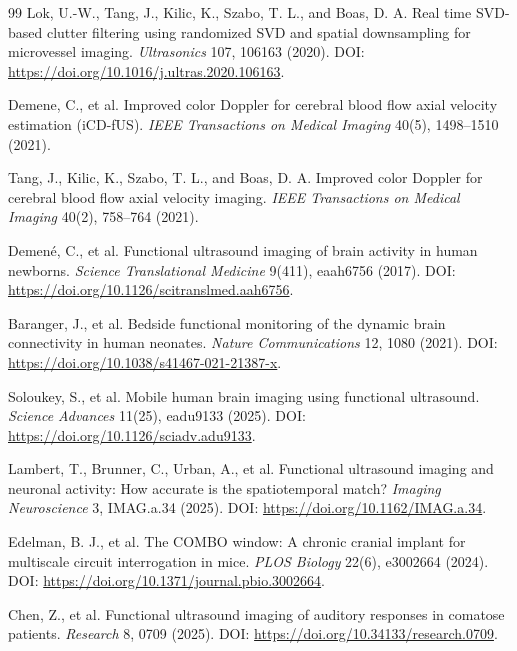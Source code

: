 \documentclass[11pt]{article}
\begin{document}
\begin{thebibliography}{99}
Lok, U.-W., Tang, J., Kilic, K., Szabo, T. L., and Boas, D. A.
\newblock Real time SVD-based clutter filtering using randomized SVD and spatial downsampling for microvessel imaging.
\newblock \emph{Ultrasonics} 107, 106163 (2020).
\newblock DOI: \url{https://doi.org/10.1016/j.ultras.2020.106163}.

Demene, C., et al.
\newblock Improved color Doppler for cerebral blood flow axial velocity estimation (iCD-fUS).
\newblock \emph{IEEE Transactions on Medical Imaging} 40(5), 1498--1510 (2021).

Tang, J., Kilic, K., Szabo, T. L., and Boas, D. A.
\newblock Improved color Doppler for cerebral blood flow axial velocity imaging.
\newblock \emph{IEEE Transactions on Medical Imaging} 40(2), 758--764 (2021).

Demen{\'e}, C., et al.
\newblock Functional ultrasound imaging of brain activity in human newborns.
\newblock \emph{Science Translational Medicine} 9(411), eaah6756 (2017).
\newblock DOI: \url{https://doi.org/10.1126/scitranslmed.aah6756}.

Baranger, J., et al.
\newblock Bedside functional monitoring of the dynamic brain connectivity in human neonates.
\newblock \emph{Nature Communications} 12, 1080 (2021).
\newblock DOI: \url{https://doi.org/10.1038/s41467-021-21387-x}.

Soloukey, S., et al.
\newblock Mobile human brain imaging using functional ultrasound.
\newblock \emph{Science Advances} 11(25), eadu9133 (2025).
\newblock DOI: \url{https://doi.org/10.1126/sciadv.adu9133}.

Lambert, T., Brunner, C., Urban, A., et al.
\newblock Functional ultrasound imaging and neuronal activity: How accurate is the spatiotemporal match?
\newblock \emph{Imaging Neuroscience} 3, IMAG.a.34 (2025).
\newblock DOI: \url{https://doi.org/10.1162/IMAG.a.34}.

Edelman, B. J., et al.
\newblock The COMBO window: A chronic cranial implant for multiscale circuit interrogation in mice.
\newblock \emph{PLOS Biology} 22(6), e3002664 (2024).
\newblock DOI: \url{https://doi.org/10.1371/journal.pbio.3002664}.

Chen, Z., et al.
\newblock Functional ultrasound imaging of auditory responses in comatose patients.
\newblock \emph{Research} 8, 0709 (2025).
\newblock DOI: \url{https://doi.org/10.34133/research.0709}.


\end{thebibliography}
\end{document}
